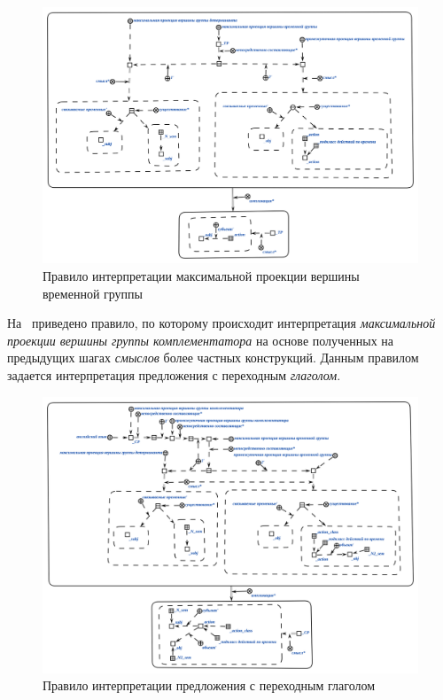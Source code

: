 \begin{figure}[h]
    \centering
    \includegraphics[scale=0.8]{images/part2/chapter_lang/d_sem_6}
    \caption{Правило интерпретации максимальной проекции вершины временной группы}
    \label{fig:d_sem_6}
\end{figure}

На~\textit{} приведено правило, по которому происходит интерпретация \textit{максимальной проекции вершины группы комплементатора} на основе полученных на предыдущих шагах \textit{смыслов} более частных конструкций.
Данным правилом задается интерпретация предложения с переходным \textit{глаголом}.

\begin{figure}[h]
    \centering
    \includegraphics[scale=0.8]{images/part2/chapter_lang/d_sem_7}
    \caption{Правило интерпретации предложения с переходным глаголом}
    \label{fig:d_sem_7}
\end{figure}

%